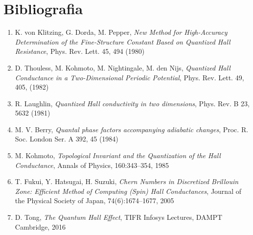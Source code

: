 \documentclass[12pt,a4paper]{article}
\begin{document}





\section{Bibliografia}
\begin{enumerate}
\item K. von Klitzing, G. Dorda, M. Pepper, \emph{New Method for High-Accuracy Determination of the Fine-Structure Constant Based on Quantized Hall Resistance}, Phys. Rev. Lett. 45, 494
(1980)
\item D. Thouless, M. Kohmoto, M. Nightingale, M. den Nijs, \emph{Quantized Hall Conductance in a Two-Dimensional Periodic Potential}, Phys. Rev. Lett. 49, 405, (1982)
\item R. Laughlin, \emph{Quantized Hall conductivity in two dimensions}, Phys. Rev. B 23, 5632 (1981)
\item M. V. Berry, \emph{Quantal phase factors accompanying adiabatic changes}, Proc. R. Soc. London Ser. A 392, 45 (1984)
\item M. Kohmoto, \emph{Topological Invariant and the Quantization of the Hall Conductance}, Annals of Physics, 160:343–354, 1985
\item T. Fukui, Y. Hatsugai, H. Suzuki, \emph{Chern Numbers in Discretized
Brillouin Zone: Efficient Method of Computing (Spin) Hall Conductances}, Journal of the Physical Society of Japan, 74(6):1674–1677, 2005
\item D. Tong, \emph{ The Quantum Hall Effect}, TIFR Infosys Lectures, DAMPT Cambridge, 2016
\end{enumerate}
\end{document}
